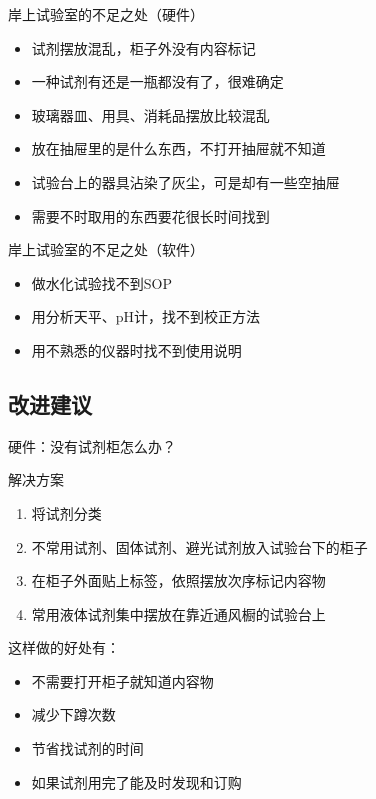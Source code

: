 \documentclass[CJKutf8]{beamer}
\newenvironment{SC}{%
  \CJKfamily{gbsn}%
  \CJKtilde
  \CJKnospace}{}
\begin{document}
\begin{CJK}{UTF8}{}
\begin{SC}
\begin{frame}
  \begin{exampleblock}{岸上试验室的不足之处（硬件）}
    \begin{itemize}
    \item 试剂摆放混乱，柜子外没有内容标记
    \item 一种试剂有还是一瓶都没有了，很难确定
    \item 玻璃器皿、用具、消耗品摆放比较混乱
    \item 放在抽屉里的是什么东西，不打开抽屉就不知道
    \item 试验台上的器具沾染了灰尘，可是却有一些空抽屉
    \item 需要不时取用的东西要花很长时间找到
    \end{itemize}
  \end{exampleblock}
\end{frame}

\begin{frame}
  \begin{exampleblock}{岸上试验室的不足之处（软件）}
    \begin{itemize}
    \item 做水化试验找不到SOP
    \item 用分析天平、pH计，找不到校正方法
    \item 用不熟悉的仪器时找不到使用说明
    \end{itemize}
  \end{exampleblock}
\end{frame}


\subsection{改进建议}

\begin{frame}{硬件：没有试剂柜怎么办？}
  \begin{block}{解决方案}
    \begin{enumerate}
    \item 将试剂分类
    \item 不常用试剂、固体试剂、避光试剂放入试验台下的柜子
    \item 在柜子外面贴上标签，依照摆放次序标记内容物
    \item 常用液体试剂集中摆放在靠近通风橱的试验台上
    \end{enumerate}
  \end{block}
  \pause
  这样做的好处有：
  \begin{itemize}
  \item 不需要打开柜子就知道内容物
  \pause
  \item 减少下蹲次数
  \pause
  \item 节省找试剂的时间
  \pause
  \item 如果试剂用完了能及时发现和订购
  \end{itemize}
\end{frame}


\end{SC}
\end{CJK}
\end{document}
